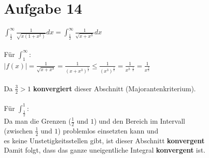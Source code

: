 \documentclass[12pt,a4paper]{article}
\begin{document}
\section*{Aufgabe 14}
$\int_\frac{1}{2}^\infty \frac{1}{\sqrt{x(1+x^2)}}dx = \int_\frac{1}{2}^\infty \frac{1}{\sqrt{x+x^3}}dx$\\
\\
Für $\int_1^\infty$:\\
$|f(x)|=\frac{1}{\sqrt{x+x^3}} = \frac{1}{(x+x^3)^\frac{1}{2}}\leq \frac{1}{(x^3)^\frac{1}{2}}=\frac{1}{x^{3\cdot \frac{1}{2}}}= \frac{1}{x^\frac{3}{2}}$\\
\\
Da $\frac{3}{2} > 1$ \textbf{konvergiert} dieser Abschnitt (Majorantenkriterium).\\
\\
Für $\int_\frac{1}{2}^1$:\\
Da man die Grenzen ($\frac{1}{2}$ und $1$) und den Bereich im Intervall \\
(zwischen $\frac{1}{2}$ und $1$) problemlos einsetzten kann und \\ 
es keine Unstetigkeitsstellen gibt, ist dieser Abschnitt \textbf{konvergent}\\
Damit folgt, dass das ganze uneigentliche Integral \textbf{konvergent} ist.\\
\\
\end{document}
